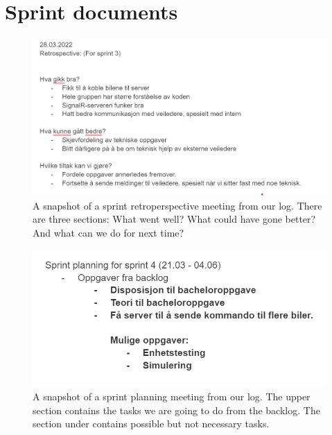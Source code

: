 \chapter{Sprint documents}
\begin{figure}[h!]
	\centering
	\includegraphics[width=1\linewidth]{figures/sprint_retroperspective}
	\caption[Sprint retroperspective]{A snapshot of a sprint retroperspective meeting from our log. There are three sections: What went well? What could have gone better? And what can we do for next time?}
	\label{fig:sprintretroperspective}
\end{figure}

\begin{figure}[h!]
	\centering
	\includegraphics[width=1\linewidth]{figures/sprint_planning}
	\caption[Sprint planning]{A snapshot of a sprint planning meeting from our log. The upper section contains the tasks we are going to do from the backlog. The section under contains possible but not necessary tasks.}
	\label{fig:sprintplanning}
\end{figure}